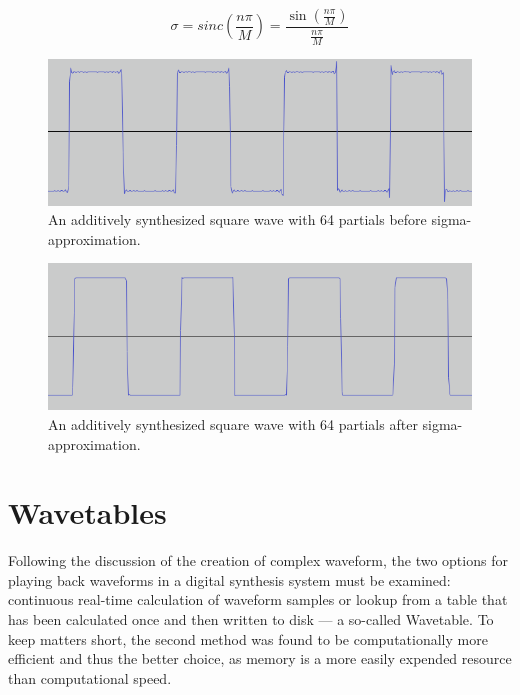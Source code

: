\begin{equation}
  \sigma = sinc(\frac{n\pi}{M}) = \frac{\sin(\frac{n\pi}{M})}{\frac{n\pi}{M}}
  \label{eq:lanczos}
\end{equation}

\begin{figure}
  \includegraphics[scale=0.5]{img/gibbsb}
  \caption{An additively synthesized square wave with 64 partials before sigma-approximation.}
  \label{fig:gibbsb}
\end{figure}

\begin{figure}
  \includegraphics[scale=0.5]{img/gibbsa}
  \caption{An additively synthesized square wave with 64 partials after sigma-approximation.}
  \label{fig:gibbsa}
\end{figure}

\pagebreak

\section{Wavetables}

Following the discussion of the creation of complex waveform, the two options for playing back waveforms in a digital synthesis system must be examined: continuous real-time calculation of waveform samples or lookup from a table that has been calculated once and then written to disk --- a so-called Wavetable. To keep matters short, the second method was found to be computationally more efficient and thus the better choice, as memory is a more easily expended resource than computational speed.

